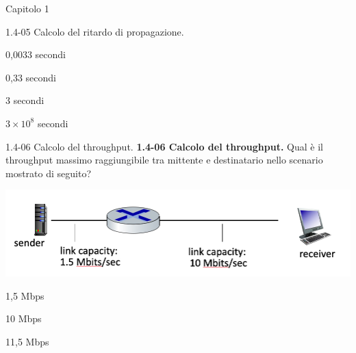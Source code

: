 \documentclass[a4paper]{article}
\begin{document}
\begin{quiz}{Capitolo 1}
\begin{multi}[points=1,shuffle=true]{1.4-05 Calcolo del ritardo di propagazione.}
\item* 0,0033 secondi
\item 0,33 secondi
\item 3 secondi
\item $3\times10^8$ secondi
\end{multi}

\begin{multi}[points=1,shuffle=true]{1.4-06 Calcolo del throughput.}
\textbf{1.4-06 Calcolo del throughput.}
Qual è il throughput massimo raggiungibile tra mittente e destinatario nello scenario mostrato di seguito?
\begin{center}
\includegraphics[width=.9\linewidth]{figs/1.4.6.jpg}
\end{center}
%
\item* 1,5 Mbps
\item 10 Mbps
\item 11,5 Mbps
\end{multi}


\end{quiz}
\end{document}
